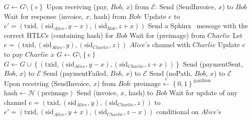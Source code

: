 \begin{algorithmic}[1]
        \State $G \leftarrow G \setminus \left\{e\right\}$
      \EndIf
    \State
    \State Upon receiving (pay, $Bob$, $x$) from $\mathcal{E}$:
      \State Send (SendInvoice, $x$) to $Bob$
      \State Wait for response (invoice, $x$, hash) from $Bob$:
        \State Update $e$ to $e' = \left(\mathrm{txid},
        \left(\mathrm{sid}_{Alice}, y - x\right),
        \left(\mathrm{sid}_{Bob}, z + x\right)\right)$ 
        \State Send a Sphinx~\cite{sphinx} message with the correct HTLCs (containing
        hash) for $Bob$
        \State {}
        \State Wait for (preimage) from $Charlie$
          \State Let $e = \left(\mathrm{txid}, \left(\mathrm{sid}_{Alice}, y\right),
          \left(\mathrm{sid}_{Charlie}, z\right)\right)$ $Alice$'s channel with $Charlie$
          \State Update $e$ to pay $Charlie$ $x$ 
          \State $G \leftarrow G \setminus \left\{e\right\}$
          \State $G \leftarrow G \cup \left\{\left(\mathrm{txid},
          \left(\mathrm{sid}_{Alice}, y - x\right), \left(\mathrm{sid}_{Charlie}, z +
          x\right)\right)\right\}$
          \State Send (paymentSent, $Bob$, $x$) to $\mathcal{E}$
        \Else
          \State Send (paymentFailed, $Bob$, $x$) to $\mathcal{E}$
        \EndIf
      \Else
        \State Send (noPath, $Bob$, $x$) to $\mathcal{E}$
      \EndIf
    \State
    \State Upon receiving (SendInvoice, $x$) from $Bob$:
      \State $\mathrm{preimage} \overset{r}{\leftarrow}
      \left\{0,1\right\}^{\mathrm{gazillion}}$
      \State $\mathrm{hash} \leftarrow \mathcal{H}\left(\mathrm{preimage}\right)$
      \State Send (invoice, $x$, hash) to $Bob$
      \State Wait for update of any channel $e = \left(\mathrm{txid},
      \left(\mathrm{sid}_{Alice}, y\right), \left(\mathrm{sid}_{Charlie}, z\right)\right)$
      to $e' = \left(\mathrm{txid}, \left(\mathrm{sid}_{Alice}, y + x\right),
      \left(\mathrm{sid}_{Charlie}, z - x\right)\right)$ conditional on $Alice$'s

\end{algorithmic}

